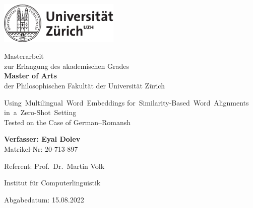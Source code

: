 \begin{titlepage}
\includegraphics[height=20mm]{graphics/uzh_logo_d_pos}\\

\begin{center}

{
Masterarbeit \\
zur Erlangung des akademischen Grades \\
\textbf{Master of Arts} \\
der Philosophischen Fakultät der Universität Zürich \\

\vspace{2cm}

{\Huge \mbox{Using Multilingual Word Embeddings} \mbox{for Similarity-Based Word Alignments} \mbox{in a Zero-Shot Setting}}\\
\vspace{0.5cm}
{\huge Tested on the Case of German--Romansh}\\

\vspace{4cm}

\textbf{Verfasser: Eyal Dolev} \\
	Matrikel-Nr: 20-713-897 \\

\vspace{2cm}

Referent: Prof.~Dr.~Martin Volk


Institut für Computerlinguistik

\vfill Abgabedatum: 15.08.2022

\vspace{3cm}
}
\end{center}

\end{titlepage}

\newpage

